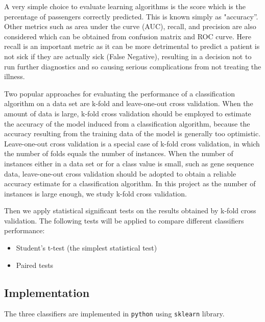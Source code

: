 A very simple choice to evaluate learning algorithms is the score which is the percentage of passengers correctly predicted. This is known simply as "accuracy”.  Other metrics such as area under the curve (AUC), recall, and precision are also considered which can be obtained from confusion matrix and ROC curve. Here recall is an important metric as  it can be more detrimental to predict a patient is not sick if they are actually sick (False Negative), resulting in a decision
not to run further diagnostics and so causing serious complications from not treating the illness.

Two popular approaches for evaluating the performance of a classification algorithm on a data set are k-fold and leave-one-out cross validation. When the amount of data is large, k-fold cross validation should be employed to estimate the accuracy of the model induced from a classification algorithm, because the accuracy resulting from the training data of the model is generally too optimistic. Leave-one-out cross validation is a special case of k-fold cross validation, in which the number of folds equals the number of instances. When the number of instances either in a data set or for a class value is small, such as gene sequence data, leave-one-out cross validation should be adopted to obtain a reliable accuracy estimate for a classification algorithm. In this project as the number of instances is large enough, we study k-fold cross validation.

Then we apply statistical significant tests on the results obtained by k-fold cross validation. The following tests will be applied to compare different classifiers performance:

\begin{itemize}
	\item Student’s t-test (the simplest statistical test)
	\item Paired tests
\end{itemize}

\subsection{Implementation}

The three classifiers are implemented in \texttt{python} using \texttt{sklearn} library.


%

